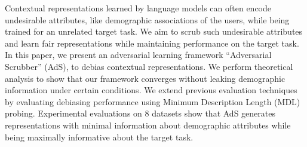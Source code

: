 Contextual representations learned by language models can often encode undesirable attributes, like demographic associations of the users, while being trained for an unrelated target task. We aim to scrub such undesirable attributes and learn fair representations while maintaining performance on the target task.  In this paper, we present an adversarial learning framework ``Adversarial Scrubber'' (AdS), to debias contextual representations. We perform theoretical analysis to show that our framework converges without leaking demographic information under certain conditions. We extend previous evaluation techniques by evaluating debiasing performance using Minimum Description Length (MDL) probing. Experimental evaluations on 8 datasets show that AdS generates representations with minimal information about demographic attributes while being maximally informative about the target task.
